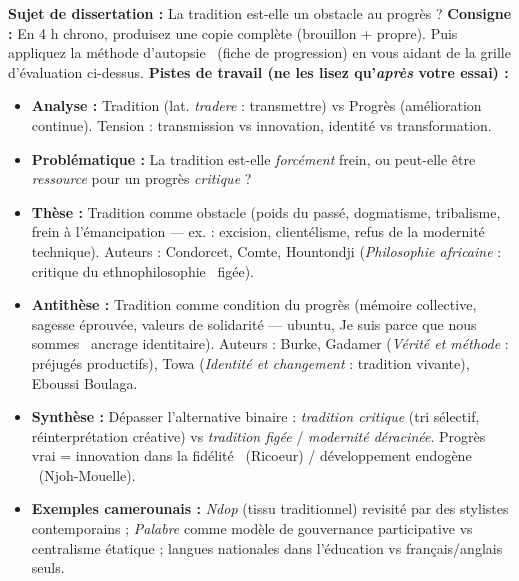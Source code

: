 \documentclass[11pt]{article}
\newcommand{\cle}[1]{{\popxbold\color{popdark}#1}}
\begin{document}
\begin{exercice}
\textbf{Sujet de dissertation :} \guillemotleft La tradition est-elle un obstacle au progrès ? \guillemotright
\textbf{Consigne :} En 4 h chrono, produisez une copie complète (brouillon + propre). Puis appliquez la \guillemotleft méthode d'autopsie \guillemotright\ (fiche de progression) en vous aidant de la grille d'évaluation ci-dessus.
\textbf{Pistes de travail (ne les lisez qu'\emph{après} votre essai) :}
\begin{itemize}
    \item \textbf{Analyse :} \cle{Tradition} (lat. \emph{tradere} : transmettre) vs \cle{Progrès} (amélioration continue). Tension : transmission vs innovation, identité vs transformation.
    \item \textbf{Problématique :} La tradition est-elle \emph{forcément} frein, ou peut-elle être \emph{ressource} pour un progrès \emph{critique} ?
    \item \textbf{Thèse :} Tradition comme obstacle (poids du passé, dogmatisme, tribalisme, frein à l'émancipation — ex. : excision, clientélisme, refus de la modernité technique). Auteurs : Condorcet, Comte, Hountondji (\emph{Philosophie africaine} : critique du \guillemotleft ethnophilosophie \guillemotright\ figée).
    \item \textbf{Antithèse :} Tradition comme condition du progrès (mémoire collective, sagesse éprouvée, valeurs de solidarité — \cle{ubuntu}, \guillemotleft Je suis parce que nous sommes \guillemotright\, ancrage identitaire). Auteurs : Burke, Gadamer (\emph{Vérité et méthode} : préjugés productifs), Towa (\emph{Identité et changement} : tradition vivante), Eboussi Boulaga.
    \item \textbf{Synthèse :} Dépasser l'alternative binaire : \emph{tradition critique} (tri sélectif, réinterprétation créative) vs \emph{tradition figée} / \emph{modernité déracinée}. Progrès vrai = \guillemotleft innovation dans la fidélité \guillemotright\ (Ricoeur) / \guillemotleft développement endogène \guillemotright\ (Njoh-Mouelle).
    \item \textbf{Exemples camerounais :} \emph{Ndop} (tissu traditionnel) revisité par des stylistes contemporains ; \emph{Palabre} comme modèle de gouvernance participative vs centralisme étatique ; langues nationales dans l'éducation vs français/anglais seuls.
\end{itemize}
\end{exercice}
\end{document}
